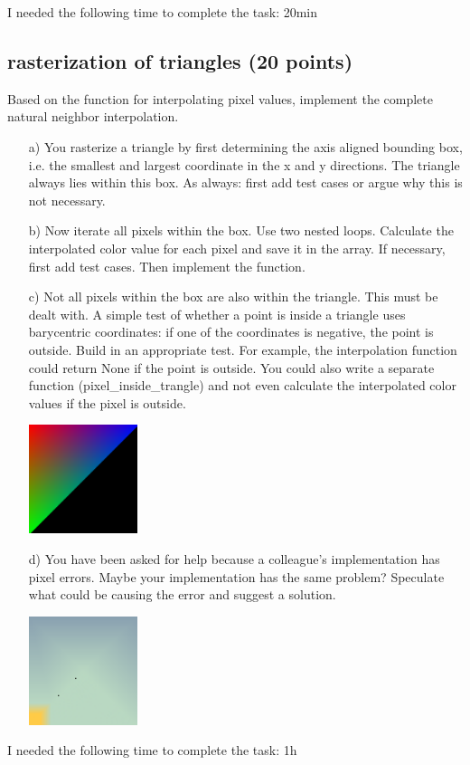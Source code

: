 I needed the following time to complete the task: 20min

\subsection{rasterization of triangles (20 points)}

Based on the function for interpolating pixel values, implement the complete natural neighbor interpolation.

\begin{enumerate}

\item[a)] You rasterize a triangle by first determining the axis aligned bounding box, i.e. the smallest and largest coordinate in the x and y directions. The triangle always lies within this box. As always: first add test cases or argue why this is not necessary.

\item[b)] Now iterate all pixels within the box. Use two nested loops. Calculate the interpolated color value for each pixel and save it in the array. If necessary, first add test cases. Then implement the function.

\item[c)] Not all pixels within the box are also within the triangle. This must be dealt with. A simple test of whether a point is inside a triangle uses barycentric coordinates: if one of the coordinates is negative, the point is outside. Build in an appropriate test. For example, the interpolation function could return None if the point is outside. You could also write a separate function (pixel\_inside\_trangle) and not even calculate the interpolated color values if the pixel is outside.

\begin{center}
\includegraphics[width=0.25\textwidth]{source_code/interpolated.png}
\end{center}

\item[d)] You have been asked for help because a colleague's implementation has pixel errors. Maybe your implementation has the same problem? Speculate what could be causing the error and suggest a solution.

\begin{center}
\includegraphics[width=0.25\textwidth]{source_code/example_pixel_error.png}
\end{center}

\end{enumerate}

I needed the following time to complete the task: 1h

